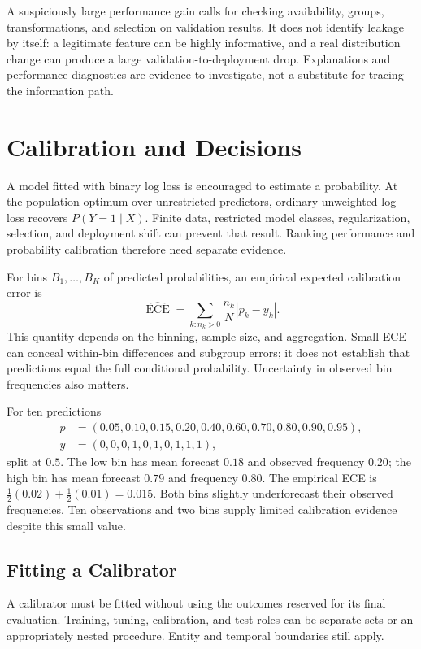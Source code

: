 A suspiciously large performance gain calls for checking availability, groups, transformations, and selection on validation results. It does not identify leakage by itself: a legitimate feature can be highly informative, and a real distribution change can produce a large validation-to-deployment drop. Explanations and performance diagnostics are evidence to investigate, not a substitute for tracing the information path.

\section{Calibration and Decisions}
\label{sec:tabular-calibration}

A model fitted with binary log loss is encouraged to estimate a probability. At the population optimum over unrestricted predictors, ordinary unweighted log loss recovers $P(Y=1\mid X)$. Finite data, restricted model classes, regularization, selection, and deployment shift can prevent that result. Ranking performance and probability calibration therefore need separate evidence.

For bins $B_1,\ldots,B_K$ of predicted probabilities, an empirical expected calibration error is
\[
\widehat{\operatorname{ECE}}=
\sum_{k:n_k>0}\frac{n_k}{N}
\left|\overline p_k-\overline y_k\right|.
\]
This quantity depends on the binning, sample size, and aggregation. Small ECE can conceal within-bin differences and subgroup errors; it does not establish that predictions equal the full conditional probability. Uncertainty in observed bin frequencies also matters.

For ten predictions
\[
\begin{aligned}
p&=(0.05,0.10,0.15,0.20,0.40,0.60,0.70,0.80,0.90,0.95),\\
y&=(0,0,0,1,0,1,0,1,1,1),
\end{aligned}
\]
split at $0.5$. The low bin has mean forecast $0.18$ and observed frequency $0.20$; the high bin has mean forecast $0.79$ and frequency $0.80$. The empirical ECE is $\tfrac12(0.02)+\tfrac12(0.01)=0.015$. Both bins slightly underforecast their observed frequencies. Ten observations and two bins supply limited calibration evidence despite this small value.

\subsection{Fitting a Calibrator}

A calibrator must be fitted without using the outcomes reserved for its final evaluation. Training, tuning, calibration, and test roles can be separate sets or an appropriately nested procedure. Entity and temporal boundaries still apply.

